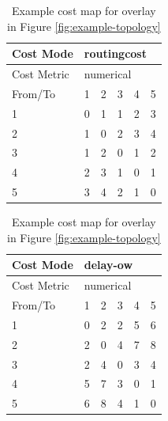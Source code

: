 \begin{table}[H]
    \centering
    \begin{subtable}{.4\linewidth}
        \centering
        \begin{tabular}{|l|l|l|l|l|l|}
        \hline
        Cost Mode   & \multicolumn{5}{|l|}{routingcost} \\ \hline
        Cost Metric & \multicolumn{5}{|l|}{numerical}   \\ \hline
        From/To     & 1    & 2     & 3   & 4   & 5      \\ \hline
        1           & 0    & 1     & 1   & 2   & 3      \\ \hline
        2           & 1    & 0     & 2   & 3   & 4      \\ \hline
        3           & 1    & 2     & 0   & 1   & 2      \\ \hline
        4           & 2    & 3     & 1   & 0   & 1      \\ \hline
        5           & 3    & 4     & 2   & 1   & 0      \\ \hline
        \end{tabular}
    \caption{Routing cost cost matrix}
    \end{subtable}
    \begin{subtable}{.4\linewidth}
        \centering
        \begin{tabular}{|l|l|l|l|l|l|}
        \hline
        Cost Mode   & \multicolumn{5}{|l|}{delay-ow}    \\ \hline
        Cost Metric & \multicolumn{5}{|l|}{numerical}   \\ \hline
        From/To     & 1    & 2     & 3   & 4   & 5      \\ \hline
        1           & 0    & 2     & 2   & 5   & 6      \\ \hline
        2           & 2    & 0     & 4   & 7   & 8      \\ \hline
        3           & 2    & 4     & 0   & 3   & 4      \\ \hline
        4           & 5    & 7     & 3   & 0   & 1      \\ \hline
        5           & 6    & 8     & 4   & 1   & 0      \\ \hline
        \end{tabular}
    \caption{One way packet delay cost matrix}
    \end{subtable}

    \caption{Example cost map for overlay in Figure \ref{fig:example-topology}}
    \label{table:costmap-example-non-boundary}
\end{table}

